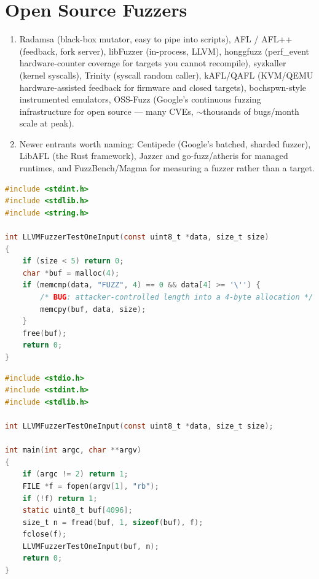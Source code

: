 \documentclass[12pt]{Training}
\begin{document}
\section*{Open Source Fuzzers}
\begin{enumerate}
    \item Radamsa (black-box mutator, easy to pipe into scripts), AFL / AFL++ (feedback, fork server), libFuzzer (in-process, LLVM), honggfuzz (perf\_event hardware-counter coverage for targets you cannot recompile), syzkaller (kernel syscalls), Trinity (syscall random caller), kAFL/QAFL (KVM/QEMU hardware-assisted feedback for firmware and closed targets), bochspwn-style instrumented emulators, OSS-Fuzz (Google's continuous fuzzing infrastructure for open source --- many CVEs, $\sim$thousands of bugs/month scale at peak).
    \item Newer entrants worth naming: Centipede (Google's batched, sharded fuzzer), LibAFL (the Rust framework), Jazzer and go-fuzz/atheris for managed runtimes, and FuzzBench/Magma for measuring a fuzzer rather than a target.
\end{enumerate}

\begin{sectionbox}
\begin{lstlisting}[language=C, caption={Demo harness: libFuzzer entry point plus minimal standalone driver. Built \texttt{clang -g -O1 -fsanitize=address}; both parts verified on this host.}]
#include <stdint.h>
#include <stdlib.h>
#include <string.h>

int LLVMFuzzerTestOneInput(const uint8_t *data, size_t size)
{
    if (size < 5) return 0;
    char *buf = malloc(4);
    if (memcmp(data, "FUZZ", 4) == 0 && data[4] >= '\'') {
        /* BUG: attacker-controlled length into a 4-byte allocation */
        memcpy(buf, data, size);
    }
    free(buf);
    return 0;
}
\end{lstlisting}
\end{sectionbox}

\begin{sectionbox}
\begin{lstlisting}[language=C, caption={Standalone driver for running the same harness on a single file (verified: triggers ASan ``heap-buffer-overflow'' at -O0, silent at -O1).}]
#include <stdio.h>
#include <stdint.h>
#include <stdlib.h>

int LLVMFuzzerTestOneInput(const uint8_t *data, size_t size);

int main(int argc, char **argv)
{
    if (argc != 2) return 1;
    FILE *f = fopen(argv[1], "rb");
    if (!f) return 1;
    static uint8_t buf[4096];
    size_t n = fread(buf, 1, sizeof(buf), f);
    fclose(f);
    LLVMFuzzerTestOneInput(buf, n);
    return 0;
}
\end{lstlisting}
\end{sectionbox}
\end{document}
